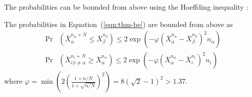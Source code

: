 The probabilities can be bounded from above using the
Hoeffding inequality \cite{Hoeffding.ineq}:
\begin{thm} The probabilities in Equation~(\ref{eqn:thm-be}) are bounded from above as
\begin{align}
  \label{eqn:probound-blnk-hoeffding}
  \Pr&(\overline X_\alpha^{{n_\alpha}+N} \le \overline X_\beta^{n_\beta})
  \le 2\exp\left(- \varphi (\overline X_\alpha^{n_\alpha} - \overline X_\beta^{n_\beta})^2 n_\alpha
  \right)\nonumber\\
  \Pr&(\overline X_{i|i\ne\alpha}^{n_i+N} \ge \overline X_\alpha^{n_\alpha})
  \le 2\exp\left(- \varphi (\overline X_\alpha^{n_\alpha} -\overline  X_i^{n_i})^2 n_i \right)
\end{align}
where $\varphi=\min \left(2(\frac {1+n/N} {1+\sqrt {n/N}})^2\right)=8(\sqrt 2 - 1)^2 > 1.37$.
\label{thm:hoeffding-prob-bounds}
\end{thm}


